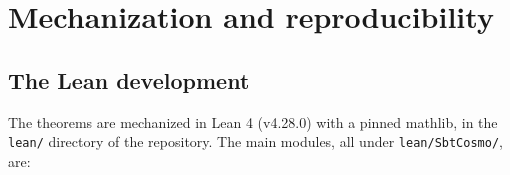 \hypertarget{appendix-c-mechanization-and-reproducibility}{%
\section{Mechanization and
reproducibility}\label{appendix-c-mechanization-and-reproducibility}}

\hypertarget{c.1-the-lean-development}{%
\subsection{The Lean development}\label{c.1-the-lean-development}}

The theorems are mechanized in Lean 4 (v4.28.0) with a pinned mathlib,
in the \texttt{lean/\allowbreak } directory of the repository. The main modules, all
under \texttt{lean/\allowbreak SbtCosmo/\allowbreak }, are:

